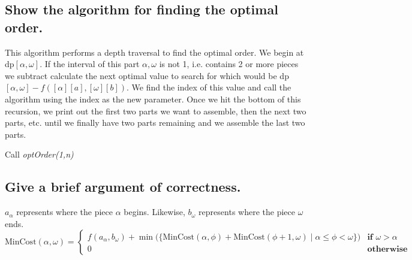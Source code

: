\documentclass[11pt]{scrartcl}
\begin{document}
	\subsection{
		Show the algorithm for finding the optimal order.
	}
	This algorithm performs a depth traversal to find the optimal order.
	We begin at dp$[\alpha, \omega]$. If the interval of this part $\alpha, \omega$
	is not 1, i.e. contains 2 or more pieces we subtract calculate the next optimal value to search for
	which would be dp$[\alpha, \omega] - f([\alpha][a],[\omega][b])$. We find the index of this value and call
	the algorithm using the index as the new parameter. Once we hit the bottom of this recursion,
	we print out the first two parts we want to assemble, then the next two parts, etc. until we finally
	have two parts remaining and we assemble the last two parts.
	\begin{algorithm}
	\end{algorithm}

	Call \textit{optOrder(1,n)}


	\subsection{
		Give a brief argument of correctness.
	}


	$a_\alpha$ represents where the piece $\alpha$ begins.
	Likewise, $b_\omega$ represents where the piece $\omega$ ends.
	\[
		\text{MinCost}(\alpha,\omega)=
		\begin{cases}
			f(a_\alpha,b_\omega) + \min\Big(
			\Big\{\text{MinCost}(\alpha, \phi) + \text{MinCost}(\phi + 1, \omega) \mid \alpha \leq \phi < \omega\Big\} \Big)
			  & \textbf{if } \omega > \alpha \\
			0 & \textbf{otherwise}
		\end{cases}
	\]
\end{document}
